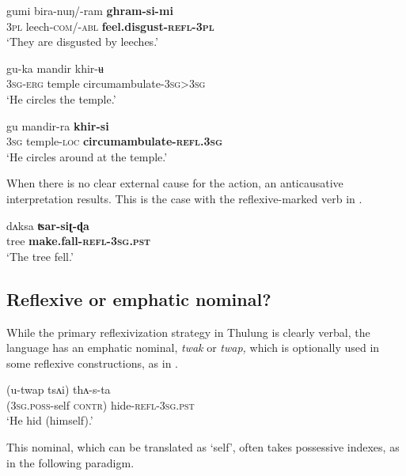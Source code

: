 \documentclass[output=paper]{langscibook}
\begin{document}
    \ex
    \label{ex:Lahaussois:17b}
    \gll gumi bira-nuŋ/-ram \textbf{ghram-si-mi}\\
        3\textsc{pl} leech-\textsc{com/-abl} \textbf{feel.disgust-\textsc{refl-3pl}}\\
    \glt ‘They are disgusted by leeches.'
\z
\z

\ea%
    \label{ex:Lahaussois:18}
    \ea
    \label{ex:Lahaussois:18a}
    \gll gu-ka mandir khir-ʉ\\
        \textsc{3sg-erg} temple circumambulate-3\textsc{sg>3sg}\\
    \glt ‘He circles the temple.'
    
    \ex
    \label{ex:Lahaussois:18b}
    \gll gu mandir-ra \textbf{khir-si}\\
        \textsc{3sg} temple-\textsc{loc} \textbf{circumambulate-\textsc{refl.3sg}}\\
    \glt ‘He circles around at the temple.'
\z
\z


When there is no clear external cause for the action, an anticausative interpretation results. This is the case with the reflexive-marked verb in . 

\ea%
    \label{ex:Lahaussois:19}
    \gll dʌksa \textbf{ʦar-siʈ-ɖa}\\
        tree \textbf{make.fall-\textsc{refl-3sg.pst}}\\
    \glt ‘The tree fell.'
    \z



\subsection{Reflexive or emphatic nominal?}
\label{sec:Lahaussois:3.3}

While the primary reflexivization strategy in Thulung is clearly verbal, the language has an emphatic nominal, \textit{twak} or \textit{twap,} which is optionally used in some reflexive constructions, as in . 

\ea%
    \label{ex:Lahaussois:20}
    \gll (u-twap tsʌi) thʌ-s-ta\\
        \textsc{(3sg.poss}{}-self \textsc{contr)} hide-\textsc{refl-3sg.pst}\\
    \glt ‘He hid (himself).'
    \z

This nominal, which can be translated as ‘self', often takes possessive indexes, as in the following paradigm.
\end{document}
